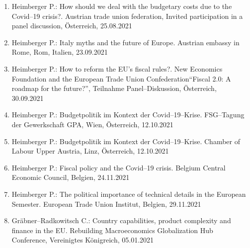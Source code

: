 \begin{enumerate}
	\item Heimberger P.: How should we deal with the budgetary costs due to the Covid--19 crisis?. Austrian trade union federation, Invited participation in a panel discussion, Österreich, 25.08.2021
	\item Heimberger P.: Italy myths and the future of Europe. Austrian embassy in Rome, Rom, Italien, 23.09.2021
	\item Heimberger P.: How to reform the EU’s fiscal rules?. New Economics Foundation and the European Trade Union Confederation“Fiscal 2.0: A roadmap for the future?”, Teilnahme Panel--Diskussion, Österreich, 30.09.2021
	\item Heimberger P.: Budgetpolitik im Kontext der Covid--19--Krise. FSG--Tagung der Gewerkschaft GPA, Wien, Österreich, 12.10.2021
	\item Heimberger P.: Budgetpolitik im Kontext der Covid--19--Krise. Chamber of Labour Upper Austria, Linz, Österreich, 12.10.2021
	\item Heimberger P.: Fiscal policy and the Covid--19 crisis. Belgium Central Economic Council, Belgien, 24.11.2021
	\item Heimberger P.: The political importance of technical details in the European Semester. European Trade Union Institut, Belgien, 29.11.2021
	\item Gräbner--Radkowitsch C.: Country capabilities, product complexity and finance in the EU. Rebuilding Macroeconomics Globalization Hub Conference, Vereinigtes Königreich, 05.01.2021
\end{enumerate}
